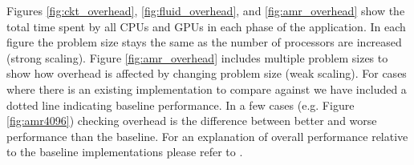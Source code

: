 Figures \ref{fig:ckt_overhead}, \ref{fig:fluid_overhead}, and \ref{fig:amr_overhead} show 
the total time spent by all CPUs and GPUs in each phase of the application.  In 
each figure the problem size stays the same as the number of processors are increased
(strong scaling).  Figure \ref{fig:amr_overhead} includes multiple problem sizes to show
how overhead is affected by changing problem size (weak scaling).  For cases where there
is an existing implementation to compare against we have included a dotted line indicating
baseline performance.  In a few cases (e.g. Figure \ref{fig:amr4096}) checking overhead is the difference
between better and worse performance than the baseline.  For an explanation of overall
performance relative to the baseline implementations please refer to \cite{Legion12}.

\begin{figure}
\begin{center}
\end{center}
\end{figure}

